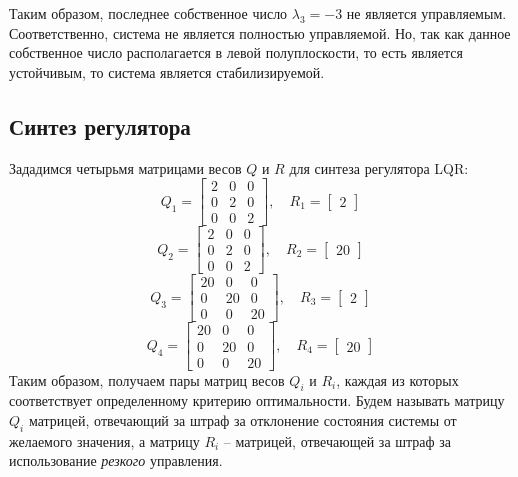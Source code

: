 Таким образом, последнее собственное число $\lambda_3 = -3$ не является управляемым. Соответственно, система не является полностью управляемой. 
Но, так как данное собственное число располагается в левой полуплоскости, то есть является устойчивым, то система является стабилизируемой. 

\subsection{Синтез регулятора}
Зададимся четырьмя матрицами весов $Q$ и $R$ для синтеза регулятора LQR: 
\begin{equation}
    Q_1 = \begin{bmatrix}
        2 & 0 & 0 \\ 
        0 & 2 & 0 \\ 
        0 & 0 & 2
    \end{bmatrix}, \quad
    R_1 = \begin{bmatrix}
        2
    \end{bmatrix}
\end{equation}
\begin{equation}
    Q_2 = \begin{bmatrix}
        2 & 0 & 0 \\ 
        0 & 2 & 0 \\ 
        0 & 0 & 2
    \end{bmatrix}, \quad
    R_2 = \begin{bmatrix}
        20
    \end{bmatrix}
\end{equation}
\begin{equation}
    Q_3 = \begin{bmatrix}
        20 & 0 & 0 \\ 
        0 & 20 & 0 \\ 
        0 & 0 & 20
    \end{bmatrix}, \quad
    R_3 = \begin{bmatrix}
        2
    \end{bmatrix}
\end{equation}
\begin{equation}
    Q_4 = \begin{bmatrix}
        20 & 0 & 0 \\ 
        0 & 20 & 0 \\ 
        0 & 0 & 20
    \end{bmatrix}, \quad
    R_4 = \begin{bmatrix}
        20
    \end{bmatrix}
\end{equation}
Таким образом, получаем пары матриц весов $Q_i$ и $R_i$, каждая из которых соответствует определенному критерию оптимальности. 
Будем называть матрицу $Q_i$ матрицей, отвечающий за штраф за отклонение состояния системы от желаемого значения, а 
матрицу $R_i$ -- матрицей, отвечающей за штраф за использование \textit{резкого} управления. 

